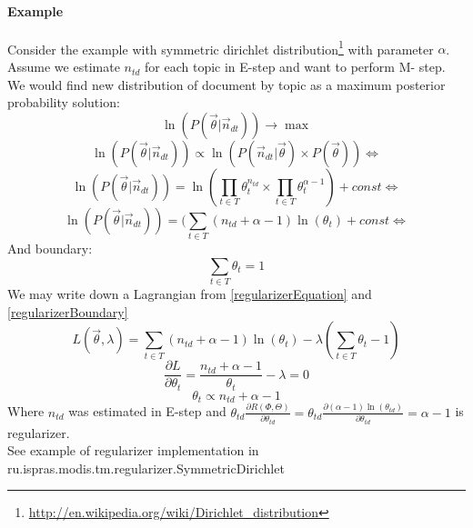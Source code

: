 	    \paragraph{Example}
		Consider the example with symmetric dirichlet distribution\footnote{\url{http://en.wikipedia.org/wiki/Dirichlet_distribution}} with parameter $\alpha$.
		Assume we estimate $n_{td}$ for each topic in E\--step and want to perform M\-- step. We would find new distribution of document by topic as a maximum posterior probability solution:
		\begin{equation} \ln(P(\vec{\theta}| \vec{n}_{dt})) \to \max \end{equation}
		\begin{equation} \ln(P(\vec{\theta}| \vec{n}_{dt})) \propto \ln(P(\vec{n}_{dt}|\vec{\theta}) \times P(\vec{\theta})) \Leftrightarrow \end{equation}
		\begin{equation} \ln(P(\vec{\theta}| \vec{n}_{dt})) = \ln(\prod_{t \in T} \theta_t^{n_{td}} \times \prod_{t \in T}\theta_t^{\alpha - 1}) + const \Leftrightarrow  \end{equation}
		\begin{equation} \label{regularizerEquation} \ln(P(\vec{\theta}| \vec{n}_{dt})) = (\sum_{t \in T}(n_{td} + \alpha - 1) \ln(\theta_t)  + const \Leftrightarrow  \end{equation}
		And boundary:
		\begin{equation} \label{regularizerBoundary} \sum_{t \in T} \theta_t = 1 \end{equation}
		We may write down a Lagrangian from \ref{regularizerEquation} and \ref{regularizerBoundary}
		\begin{equation} L(\vec{\theta}, \lambda) = \sum_{t \in T}(n_{td} + \alpha - 1) \ln(\theta_t) - \lambda (\sum_{t \in T} \theta_t - 1)  \end{equation}
		\begin{equation} \frac{\partial L}{\partial \theta_t} = \frac{n_{td} + \alpha - 1}{\theta_t} - \lambda = 0  \end{equation}
		\begin{equation} \theta_t \propto  n_{td} + \alpha - 1 \end{equation}
		Where $n_{td}$ was estimated in E\--step and
		$\theta_{td}\frac{\partial  R(\Phi, \Theta)}{\partial \theta_{td}} = \theta_{td} \frac{\partial (\alpha - 1)\ln(\theta_{td})}{\partial \theta_{td}} = \alpha - 1 $
		is regularizer.\\
		See example of regularizer implementation in ru.ispras.modis.tm.regularizer.SymmetricDirichlet
		
		